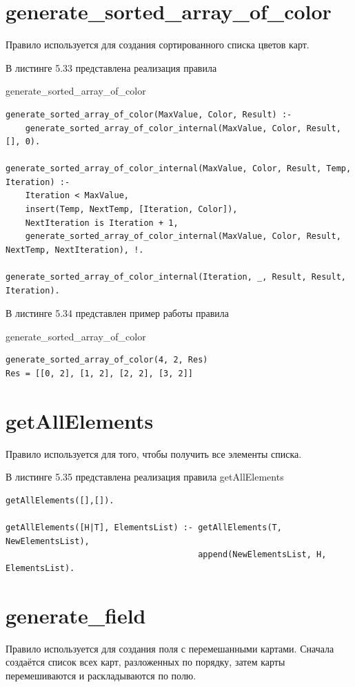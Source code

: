 \documentclass[12pt]{report}
\begin{document}
\section{generate\_sorted\_array\_of\_color}
Правило используется для создания сортированного списка цветов карт.

В листинге 5.33 представлена реализация правила

generate\_sorted\_array\_of\_color

\begin{lstlisting}[label=some-code, caption=реализация правила generate\_sorted\_array\_of\_color]
generate_sorted_array_of_color(MaxValue, Color, Result) :-
	generate_sorted_array_of_color_internal(MaxValue, Color, Result, [], 0).

generate_sorted_array_of_color_internal(MaxValue, Color, Result, Temp, Iteration) :-
	Iteration < MaxValue,
	insert(Temp, NextTemp, [Iteration, Color]),
	NextIteration is Iteration + 1,
	generate_sorted_array_of_color_internal(MaxValue, Color, Result, NextTemp, NextIteration), !.

generate_sorted_array_of_color_internal(Iteration, _, Result, Result, Iteration).
\end{lstlisting}

В листинге 5.34 представлен пример работы правила

generate\_sorted\_array\_of\_color

\begin{lstlisting}[label=some-code, caption=реализация правила generate\_sorted\_array\_of\_color]
generate_sorted_array_of_color(4, 2, Res)
Res = [[0, 2], [1, 2], [2, 2], [3, 2]]
\end{lstlisting}
\section{getAllElements}
Правило используется для того, чтобы получить все элементы списка.

В листинге 5.35 представлена реализация правила getAllElements

\begin{lstlisting}[label=some-code, caption=реализация правила getAllElements]
getAllElements([],[]).

getAllElements([H|T], ElementsList) :- getAllElements(T, NewElementsList),
									   append(NewElementsList, H, ElementsList).
\end{lstlisting}
\section{generate\_field}
Правило используется для создания поля с перемешанными картами. Сначала создаётся список всех карт, разложенных по порядку, затем карты перемешиваются и раскладываются по полю.
\end{document}

